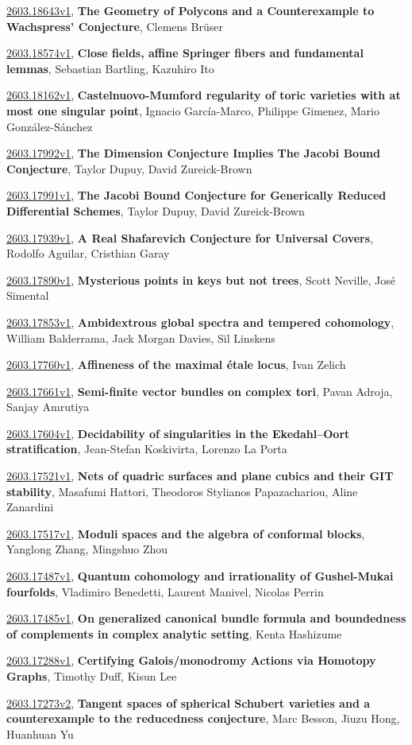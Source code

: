 \documentclass[9pt, a4paper]{article}
\theoremstyle{plain}
\theoremstyle{definition}
\theoremstyle{remark}
\newcommand{\arxiv}[3]{\href{https://arxiv.org/abs/#1}{#1}, \textbf{\textcolor{arxivblue}{#2}}, #3}
\begin{document}
\arxiv{2603.18643v1}{The Geometry of Polycons and a Counterexample to Wachspress' Conjecture}{Clemens Brüser}

\arxiv{2603.18574v1}{Close fields, affine Springer fibers and fundamental lemmas}{Sebastian Bartling, Kazuhiro Ito}

\arxiv{2603.18162v1}{Castelnuovo-Mumford regularity of toric varieties with at most one singular point}{Ignacio García-Marco, Philippe Gimenez, Mario González-Sánchez}

\arxiv{2603.17992v1}{The Dimension Conjecture Implies The Jacobi Bound Conjecture}{Taylor Dupuy, David Zureick-Brown}

\arxiv{2603.17991v1}{The Jacobi Bound Conjecture for Generically Reduced Differential Schemes}{Taylor Dupuy, David Zureick-Brown}

\arxiv{2603.17939v1}{A Real Shafarevich Conjecture for Universal Covers}{Rodolfo Aguilar, Cristhian Garay}

\arxiv{2603.17890v1}{Mysterious points in keys but not trees}{Scott Neville, José Simental}

\arxiv{2603.17853v1}{Ambidextrous global spectra and tempered cohomology}{William Balderrama, Jack Morgan Davies, Sil Linskens}

\arxiv{2603.17760v1}{Affineness of the maximal étale locus}{Ivan Zelich}

\arxiv{2603.17661v1}{Semi-finite vector bundles on complex tori}{Pavan Adroja, Sanjay Amrutiya}

\arxiv{2603.17604v1}{Decidability of singularities in the Ekedahl--Oort stratification}{Jean-Stefan Koskivirta, Lorenzo La Porta}

\arxiv{2603.17521v1}{Nets of quadric surfaces and plane cubics and their GIT stability}{Masafumi Hattori, Theodoros Stylianos Papazachariou, Aline Zanardini}

\arxiv{2603.17517v1}{Moduli spaces and the algebra of conformal blocks}{Yanglong Zhang, Mingshuo Zhou}

\arxiv{2603.17487v1}{Quantum cohomology and irrationality of Gushel-Mukai fourfolds}{Vladimiro Benedetti, Laurent Manivel, Nicolas Perrin}

\arxiv{2603.17485v1}{On generalized canonical bundle formula and boundedness of complements in complex analytic setting}{Kenta Hashizume}

\arxiv{2603.17288v1}{Certifying Galois/monodromy Actions via Homotopy Graphs}{Timothy Duff, Kisun Lee}

\arxiv{2603.17273v2}{Tangent spaces of spherical Schubert varieties and a counterexample to the reducedness conjecture}{Marc Besson, Jiuzu Hong, Huanhuan Yu}
\end{document}
